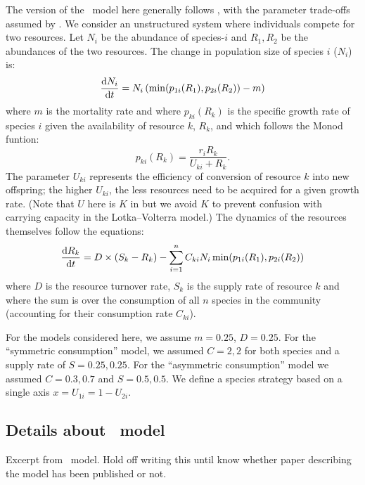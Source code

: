 \documentclass[a4paper,11pt]{article}
\begin{document}
The version of the \Rstar\ model here generally follows
\citet{Huisman-2001}, with the parameter trade-offs assumed by
\citet{Fox-2008}.
%
We consider an unstructured system where individuals compete for two
resources. Let $N_i$ be the abundance of species-$i$ and $R_1, R_2$ be
the abundances of the two resources.
%
The change in population size of species $i$ ($N_i$) is:
\begin{equation}
  \label{eq:rstar-n}
  \frac{\mathrm{d} N_i}{\mathrm{d} t} = N_i \, (\min(p_{1i}(R_1), p_{2i}(R_2)) - m)
\end{equation}
where $m$ is the mortality rate and where $p_{ki}(R_k)$ is the
specific growth rate of species $i$ given the availability of resource
$k$, $R_k$, and which follows the Monod funtion:
\begin{equation}
  \label{eq:rstar-p}
  p_{ki}(R_k) = \frac{r_i R_k}{U_{ki} + R_k}.
\end{equation}
%
The parameter $U_{ki}$ represents the efficiency of conversion of
resource $k$ into new offspring; the higher $U_{ki}$, the less
resources need to be acquired for a given growth rate.  (Note that $U$
here is $K$ in \citealt{Huisman-2001} but we avoid $K$ to prevent
confusion with carrying capacity in the Lotka--Volterra model.)
%
The dynamics of the resources themselves follow the equations:
\begin{equation}
  \label{eq:rstar-r}
  \frac{\mathrm{d} R_k}{\mathrm{d} t} =
  D \times (S_k - R_k) - \sum_{i=1}^n {C_{ki} N_i
    \min(p_{1i}(R_1), p_{2i}(R_2))}
\end{equation}
where $D$ is the resource turnover rate, $S_k$ is the supply rate of
resource $k$ and where the sum is over the consumption of all $n$ species in the community (accounting for their consumption rate $C_{ki}$).



For the models considered here, we assume $m = 0.25$, $D=0.25$.
%
For the ``symmetric consumption'' model, we assumed $C = {2, 2}$
for both species and a supply rate of  $S = {0.25, 0.25}$.  For the
``asymmetric consumption'' model we assumed $C = {0.3, 0.7}$ and
$S = {0.5, 0.5}$.  We define a species strategy based on a single axis
$x = U_{1i} = 1 - U_{2i}$.


\subsection{Details about \plant\ model}\label{sec:plant}

Excerpt from  \plant\ model. Hold off writing this until know whether paper describing
the model has been published or not.
\end{document}
